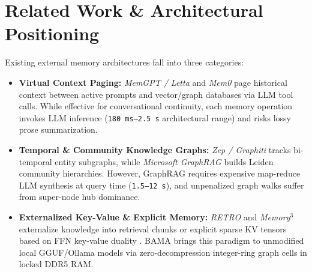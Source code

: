 \documentclass[10pt,twocolumn,letterpaper]{article}
\begin{document}
\section{Related Work \& Architectural Positioning}
Existing external memory architectures fall into three categories:
\begin{itemize}
    \item \textbf{Virtual Context Paging:} \textit{MemGPT / Letta} \cite{packer2023memgpt} and \textit{Mem0} \cite{chhikara2025mem0} page historical context between active prompts and vector/graph databases via LLM tool calls. While effective for conversational continuity, each memory operation invokes LLM inference (\texttt{180\,ms--2.5\,s} architectural range) and risks lossy prose summarization.
    \item \textbf{Temporal \& Community Knowledge Graphs:} \textit{Zep / Graphiti} \cite{rasmussen2025zep} tracks bi-temporal entity subgraphs, while \textit{Microsoft GraphRAG} \cite{edge2024graphrag} builds Leiden community hierarchies. However, GraphRAG requires expensive map-reduce LLM synthesis at query time (\texttt{1.5--12\,s}), and unpenalized graph walks suffer from super-node hub dominance.
    \item \textbf{Externalized Key-Value \& Explicit Memory:} \textit{RETRO} \cite{borgeaud2022retro} and \textit{Memory$^3$} \cite{yang2024memory3} externalize knowledge into retrieval chunks or explicit sparse KV tensors based on FFN key-value duality \cite{geva2021transformer}. BAMA brings this paradigm to unmodified local GGUF/Ollama models via zero-decompression integer-ring graph cells in locked DDR5 RAM.
\end{itemize}
\end{document}
